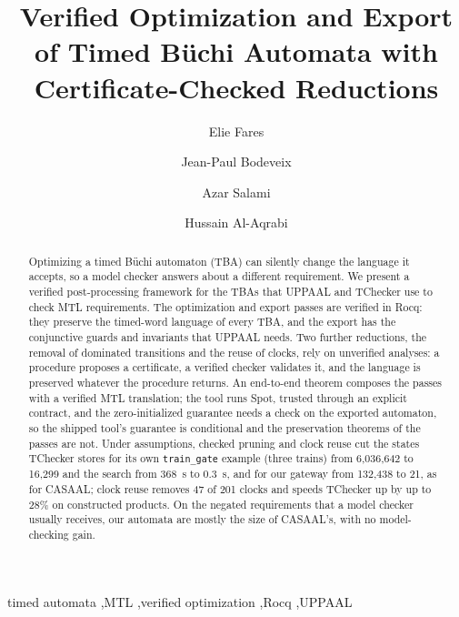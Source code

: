 \documentclass[preprint,12pt]{elsarticle}
\begin{document}
\begin{frontmatter}
\title{Verified Optimization and Export of Timed B\"uchi Automata with Certificate-Checked Reductions}

\author[hct]{Elie Fares}
\author[irit]{Jean-Paul Bodeveix}
\author[hct]{Azar Salami}
\author[hct]{Hussain Al-Aqrabi}

\begin{abstract}
Optimizing a timed B\"uchi automaton (TBA) can silently change the language it accepts, so a model checker answers about a different requirement. We present a verified post-processing framework for the TBAs that UPPAAL and TChecker use to check MTL requirements. The optimization and export passes are verified in Rocq: they preserve the timed-word language of every TBA, and the export has the conjunctive guards and invariants that UPPAAL needs. Two further reductions, the removal of dominated transitions and the reuse of clocks, rely on unverified analyses: a procedure proposes a certificate, a verified checker validates it, and the language is preserved whatever the procedure returns. An end-to-end theorem composes the passes with a verified MTL translation; the tool runs Spot, trusted through an explicit contract, and the zero-initialized guarantee needs a check on the exported automaton, so the shipped tool's guarantee is conditional and the preservation theorems of the passes are not. Under assumptions, checked pruning and clock reuse cut the states TChecker stores for its own \texttt{train\_gate} example (three trains) from 6{,}036{,}642 to 16{,}299 and the search from 368~s to 0.3~s, and for our gateway from 132{,}438 to 21, as for CASAAL; clock reuse removes 47 of 201 clocks and speeds TChecker up by up to 28\% on constructed products. On the negated requirements that a model checker usually receives, our automata are mostly the size of CASAAL's, with no model-checking gain.
\end{abstract}

\begin{keyword}
timed automata \sep MTL \sep verified optimization \sep Rocq \sep UPPAAL
\end{keyword}
\end{frontmatter}
\end{document}
